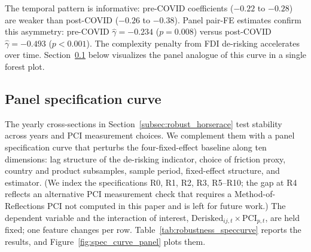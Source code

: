 The temporal pattern is informative: pre-COVID coefficients ($-0.22$ to $-0.28$) are weaker than post-COVID ($-0.26$ to $-0.38$). Panel pair-FE estimates confirm this asymmetry: pre-COVID $\hat{\gamma} = -0.234$ ($p = 0.008$) versus post-COVID $\hat{\gamma} = -0.493$ ($p < 0.001$). The complexity penalty from FDI de-risking accelerates over time. Section~\ref{subsec:robust_speccurve} below visualizes the panel analogue of this curve in a single forest plot.

\subsection{Panel specification curve}
\label{subsec:robust_speccurve}

The yearly cross-sections in Section~\ref{subsec:robust_horserace} test stability across years and PCI measurement choices. We complement them with a panel specification curve that perturbs the four-fixed-effect baseline along ten dimensions: lag structure of the de-risking indicator, choice of friction proxy, country and product subsamples, sample period, fixed-effect structure, and estimator. (We index the specifications R0, R1, R2, R3, R5--R10; the gap at R4 reflects an alternative PCI measurement check that requires a Method-of-Reflections PCI not computed in this paper and is left for future work.) The dependent variable and the interaction of interest, $\text{Derisked}_{ij,t} \times \text{PCI}_{p,t}$, are held fixed; one feature changes per row. Table~\ref{tab:robustness_speccurve} reports the results, and Figure~\ref{fig:spec_curve_panel} plots them.

\begin{table}[htbp]
\centering
\caption{Robustness: Panel Specification Curve}
\label{tab:robustness_speccurve}
\begin{threeparttable}
\footnotesize
\setlength{\tabcolsep}{4pt}

\begin{tablenotes}
\end{tablenotes}
\end{threeparttable}
\end{table}


